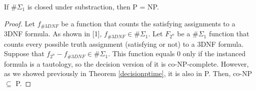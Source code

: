 \begin{theo}
If $\#\Sigma_1$ is closed under substraction, then {\sc P} = {\sc NP}.
\end{theo}
\begin{proof}
Let $f_{\#3DNF}$ be a function that counts the satisfying assignments to a 3DNF formula. As shown in [1], $f_{\#3DNF} \in \#\Sigma_1$. Let $F_{2^n}$ be a $\#\Sigma_1$ function that counts every possible truth assignment (satisfying or not) to a 3DNF formula. Suppose that $f_{2^n}-f_{\#3DNF} \in \#\Sigma_1$. This function equals 0 only if the instanced formula is a tautology, so the decision version of it is co-NP-complete. However, as we showed previously in Theorem \ref{decisionptime}, it is also in P. Then, co-NP $\subseteq$ P.
\end{proof}